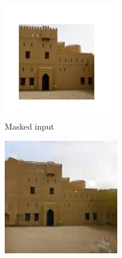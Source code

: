 \documentclass{article}
\begin{document}
\begin{figure}
	\captionsetup[subfigure]{labelformat=empty}
    \centering
    \begin{subfigure}[b]{0.15\textwidth}
        \includegraphics[width=\textwidth]{figs/fig3/masked_input}
        \caption{Masked input}
    \end{subfigure}
    \hfill
    \begin{subfigure}[b]{0.15\textwidth}
        \includegraphics[width=\textwidth]{figs/fig3/local}

\end{subfigure}
\end{figure}
\end{document}
